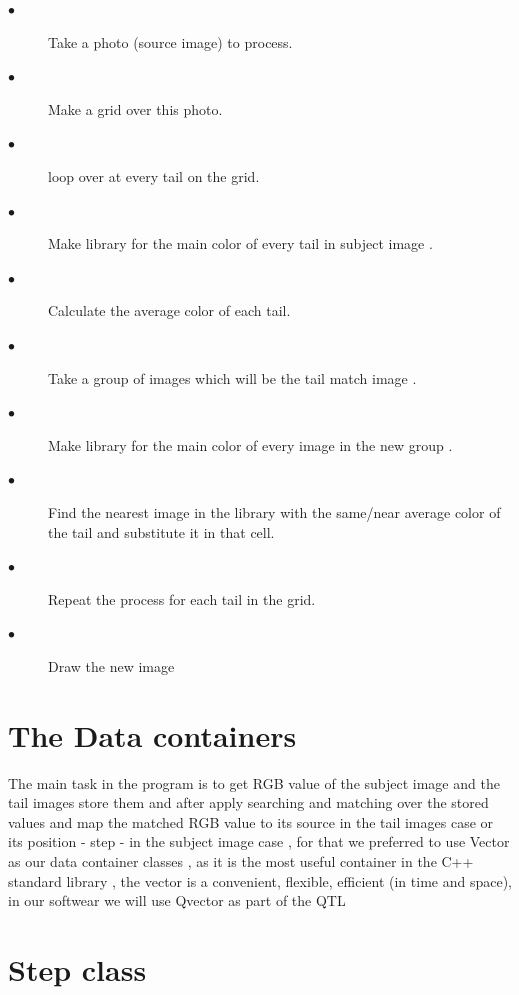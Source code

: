 \documentclass[a4paper,12pt]{report}
\begin{document}
	
		\begin{description}
	
	   	\item[$\bullet$ ]Take a photo (source image) to process.
	
 	    \item[$\bullet$ ]Make a grid over this photo.
	
		\item[$\bullet$ ]loop over at every tail on the grid.
		\item[$\bullet$ ] Make library for the main color of every tail in subject image .
	
		\item[$\bullet$ ]Calculate the average color of each tail.
		
		\item[$\bullet$ ] Take a group of images which will be the tail match image .
		
		\item[$\bullet$ ] Make library for the main color of every image in the new group .
	
		\item[$\bullet$ ]	Find the nearest image in the library with the same/near average color of the tail and substitute it in that cell.
	
		\item[$\bullet$ ]	Repeat the process for each tail in the grid.
		\item[$\bullet$ ] Draw the new image 

\end{description}

\section{The Data containers }

The main task in the program is to get RGB value of the subject image and the tail images store them and after apply searching and matching over the stored values and map the matched RGB value to its source in the tail images case or its position - step - in the subject image case , for that we preferred to use Vector as our data container classes , as it is the  most useful container in the C++ standard library , the vector is a convenient, flexible, efficient (in time and space), in our softwear we will use Qvector as part of the QTL\cite{5}  
 
 
 
 \section{Step class}
 
\end{document}
